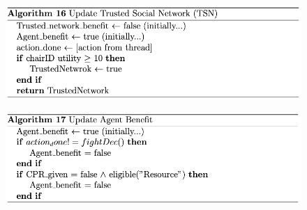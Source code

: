 

\begin{figure}[htb]
    \centering
    \includegraphics[scale=0.7]{006_team_3_agent_design/FIGS/Algo16.png}
    \label{fig:algo16}
\end{figure}



\begin{figure}[htb]
    \centering
    \includegraphics[scale=0.7]{006_team_3_agent_design/FIGS/Algo17.png}
    \label{fig:algo17}
\end{figure}

